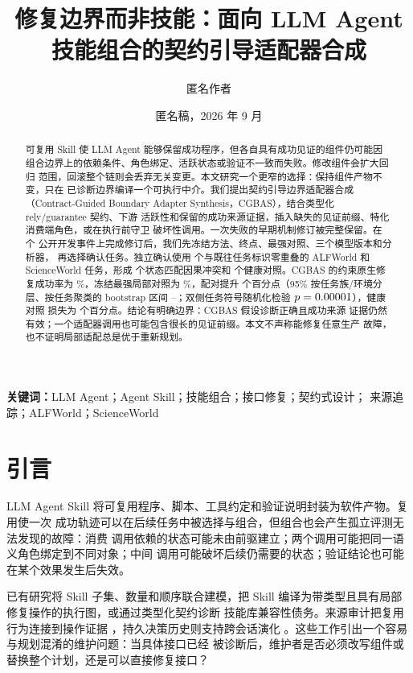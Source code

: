 \documentclass[10pt]{article}
\title{修复边界而非技能：面向 LLM Agent 技能组合的契约引导适配器合成}
\author{匿名作者}
\date{匿名稿，2026 年 9 月}
\begin{document}
\maketitle

\begin{abstract}
可复用 Skill 使 LLM Agent 能够保留成功程序，但各自具有成功见证的组件仍可能因
组合边界上的依赖条件、角色绑定、活跃状态或验证不一致而失败。修改组件会扩大回归
范围，回滚整个链则会丢弃无关变更。本文研究一个更窄的选择：保持组件产物不变，只在
已诊断边界编译一个可执行中介。我们提出契约引导边界适配器合成（Contract-Guided
Boundary Adapter Synthesis，CGBAS），结合类型化 rely/guarantee 契约、下游
活跃性和保留的成功来源证据，插入缺失的见证前缀、特化消费端角色，或在执行前守卫
破坏性调用。一次失败的早期机制修订被完整保留。在 \DevelopmentIncidentCount{} 个
公开开发事件上完成修订后，我们先冻结方法、终点、最强对照、三个模型版本和分析器，
再选择确认任务。独立确认使用 \ConfirmationRosterCount{} 个与既往任务标识零重叠的
ALFWorld 和 ScienceWorld 任务，形成 \ValidCausalCount{} 个状态匹配因果冲突和
\ValidControlCount{} 个健康对照。CGBAS 的约束原生修复成功率为
\PrimaryMethodRate\%，冻结最强局部对照为 \PrimaryComparatorRate\%，配对提升
\PrimaryGain{} 个百分点（95\% 按任务族/环境分层、按任务聚类的 bootstrap 区间
\PrimaryCILow--\PrimaryCIHigh；双侧任务符号随机化检验 $p=0.00001$），健康对照
损失为 \ControlLoss{} 个百分点。结论有明确边界：CGBAS 假设诊断正确且成功来源
证据仍然有效；一个适配器调用也可能包含很长的见证前缀。本文不声称能修复任意生产
故障，也不证明局部适配总是优于重新规划。
\end{abstract}

\noindent\textbf{关键词：}LLM Agent；Agent Skill；技能组合；接口修复；契约式设计；
来源追踪；ALFWorld；ScienceWorld

\section{引言}

LLM Agent Skill 将可复用程序、脚本、工具约定和验证说明封装为软件产物。复用使一次
成功轨迹可以在后续任务中被选择与组合，但组合也会产生孤立评测无法发现的故障：消费
调用依赖的状态可能未由前驱建立；两个调用可能把同一语义角色绑定到不同对象；中间
调用可能破坏后续仍需要的状态；验证结论也可能在某个效果发生后失效。

已有研究将 Skill 子集、数量和顺序联合建模\citep{zhao2026skillcomposer}，把 Skill
编译为带类型且具有局部修复操作的执行图\citep{xia2026grasp}，或通过类型化契约诊断
技能库兼容性债务\citep{pu2026skillops}。来源审计把复用行为连接到操作证据
\citep{chen2026multitrace}，持久决策历史则支持跨会话演化
\citep{li2026skillhone}。这些工作引出一个容易与规划混淆的维护问题：当具体接口已经
被诊断后，维护者是否必须改写组件或替换整个计划，还是可以直接修复接口？
\end{document}
